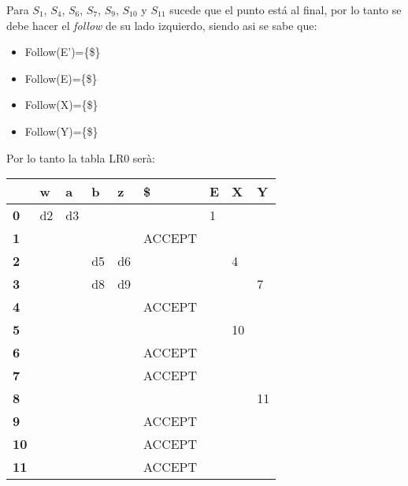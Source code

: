 \documentclass[11pt,a4paper]{article}
\begin{document}
\newpage
Para $S_{1}$, $S_{4}$, $S_{6}$, $S_{7}$, $S_{9}$, $S_{10}$ y $S_{11}$ sucede que el punto está al final, por lo tanto se debe hacer el \textit{follow} de su lado izquierdo, siendo asi se sabe que:

\begin{itemize}
\item Follow(E')=\{\$\}
\item Follow(E)=\{\$\}
\item Follow(X)=\{\$\}
\item Follow(Y)=\{\$\}
\end{itemize}

Por lo tanto la tabla LR0 serà:
\begin{table}[h]
\begin{tabular}{|l|l|l|l|l|l|l|l|l|}
\hline
\textbf{} & \textbf{w} & \textbf{a} & \textbf{b} & \textbf{z} & \textbf{\$} & \textbf{E} & \textbf{X} & \textbf{Y} \\ \hline
\textbf{0} & d2 & d3 &  &  &  & 1 &  &  \\ \hline
\textbf{1} &  &  &  &  & ACCEPT &  &  &  \\ \hline
\textbf{2} &  &  & d5 & d6 &  &  & 4 &  \\ \hline
\textbf{3} &  &  & d8 & d9 &  &  &  & 7 \\ \hline
\textbf{4} &  &  &  &  & ACCEPT &  &  &  \\ \hline
\textbf{5} &  &  &  &  &  &  & 10 &  \\ \hline
\textbf{6} &  &  &  &  & ACCEPT &  &  &  \\ \hline
\textbf{7} &  &  &  &  & ACCEPT &  &  &  \\ \hline
\textbf{8} &  &  &  &  &  &  &  & 11 \\ \hline
\textbf{9} &  &  &  &  & ACCEPT &  &  &  \\ \hline
\textbf{10} &  &  &  &  & ACCEPT &  &  &  \\ \hline
\textbf{11} &  &  &  &  & ACCEPT &  &  &  \\ \hline
\end{tabular}
\end{table}
\end{document}
